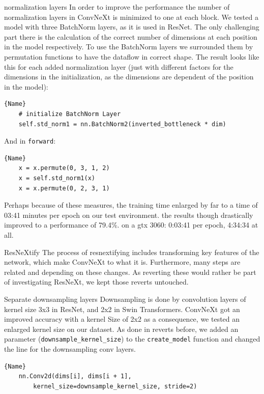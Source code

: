 \documentclass{article}
\begin{document}
normalization layers
In order to improve the performance the number of normalization layers in ConvNeXt is minimized to one at each block. We tested a model with three BatchNorm layers, as it is used in ResNet. The only challenging part there is the calculation of the correct number of dimensions at each position in the model respectively. To use the BatchNorm layers we surrounded them by permutation functions to have the dataflow in correct shape. The result looks like this for each added normalization layer (just with different factors for the dimensions in the initialization, as the dimensions are dependent of the position in the model):
\begin{lstlisting}{Name}
    # initialize BatchNorm Layer
    self.std_norm1 = nn.BatchNorm2(inverted_bottleneck * dim)
\end{lstlisting}
And in \texttt{forward}:
\begin{lstlisting}{Name}
    x = x.permute(0, 3, 1, 2)
    x = self.std_norm1(x)
    x = x.permute(0, 2, 3, 1)
\end{lstlisting}

Perhaps because of these measures, the training time enlarged by far to a time of 03:41 minutes per epoch on our test environment. the results though drastically improved to a performance of 79.4\%.
on a gtx 3060: 0:03:41 per epoch, 4:34:34 at all.

ResNeXtify
The process of resnextifying includes transforming key features of the network, which make ConvNeXt to what it is. Furthermore, many steps are related and depending on these changes. As reverting these would rather be part of investigating ResNeXt, we kept those reverts untouched.

Separate downsampling layers
Downsampling is done by convolution layers of kernel size 3x3 in ResNet, and 2x2 in Swin Transformers. ConvNeXt got an improved accuracy with a kernel Size of 2x2 as a consequence, we tested an enlarged kernel size on our dataset. As done in reverts before, we added an parameter (\texttt{downsample\_kernel\_size}) to the \texttt{create\_model} function and changed the line for the downsampling conv layers.
\begin{lstlisting}{Name}
    nn.Conv2d(dims[i], dims[i + 1], 
        kernel_size=downsample_kernel_size, stride=2)
\end{lstlisting}

\end{document}
